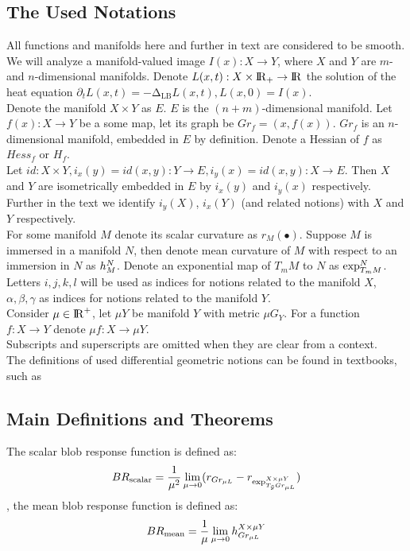 \documentclass{llncs}
\newcommand{\LaplaceBeltrami}{\mathrm{\Delta_{{LB}}}}
\newcommand{\partderiv}[2]{\partial_{#2} {#1}}
\newcommand{\toreal}{\rightarrow\bbbr}
\newcommand{\TangentSpaceArg}[2]{{T_{#2}}{#1}}
\newcommand{\FRScalar}{BR_{\mathrm{scalar}}}
\newcommand{\FRMean}{BR_{\mathrm{mean}}}
\begin{document}
\subsection{The Used Notations}
All functions and manifolds here and further in text are considered to be smooth. 
\\ 
We will analyze a manifold-valued image $I(x):X \to Y$, where $X$ and $Y$ are $m$- and $n$-dimensional manifolds. Denote $L(x,t):X\times \bbbr_{+} \toreal$ the solution of the heat equation $\partderiv{L(x, t)}{t}=-\LaplaceBeltrami{ L(x, t)},L(x, 0)=I(x)$. 
\\
Denote the manifold $X\times Y$ as $E$. $E$ is the $(n+m)$-dimensional manifold. Let $f(x):X\to Y$ be a some map, let its graph be $Gr_f=(x,f(x))$. $Gr_f$ is an $n$-dimensional manifold, embedded in $E$ by definition. Denote a Hessian of $f$ as $Hess_f$ or $H_f$.
\\
Let $id:X\times Y, i_x(y)=id(x, y):Y\to E, i_y(x)=id(x, y):X\to E$. Then $X$ and $Y$ are isometrically embedded in $E$ by $i_x(y)$ and $i_y(x)$ respectively. Further in the text we identify $i_y(X)$, $i_x(Y)$ (and related notions) with $X$ and $Y$ respectively.
\\
For some manifold $M$ denote its scalar curvature as $r_M(∙)$. Suppose $M$ is immersed in a manifold $N$, then denote mean curvature of $M$ with respect to an immersion in $N$ as $\tensor*{h}{^{N}_{M}}$. Denote an exponential map of $\TangentSpaceArg{M}{m}$ to $N$ as $\tensor*{\exp}{^N_{\TangentSpaceArg{M}{m}}}$.
\\
Letters $i,j,k,l$ will be used as indices for notions related to the manifold $X$, $\alpha, \beta, \gamma$ as indices for notions related to the manifold $Y$.
\\
Consider $\mu \in {\rm I\!R}^{+}$, let $\mu Y$ be manifold $Y$ with metric $\mu G_Y$. For a function $f:X\to Y$ denote $\mu f:X\to \mu Y$.
\\
Subscripts and superscripts are omitted when they are clear from a context.
\\The definitions of used differential geometric notions can be found in textbooks, such as \cite{DiffGeom}
\subsection{Main Definitions and Theorems}

\begin{definition} \label{RiemanDef}
The scalar blob response function is defined as:
$$\FRScalar=\frac{1}{\mu ^ 2}\lim_{\mu\to 0} ( r_{Gr_{\mu L}} - r_{\tensor*{\exp}{^{X\times\mu Y}_{\TangentSpaceArg{Gr_{\mu L}}{\tilde{y}}}}} )$$,
the mean blob response function is defined as:
$$\FRMean=\frac{1}{\mu}\lim_{\mu\to 0} \tensor*{h}{^{X\times\mu Y}_{Gr_{\mu L}}}$$
\end{definition}
\end{document}
